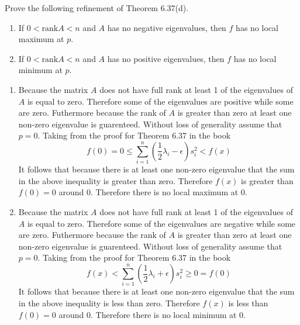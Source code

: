 Prove the following refinement of Theorem 6.37(d).
\begin{enumerate}
\item If $0 < \text{rank}A < n$ and $A$ has no negative eigenvalues,
  then $f$ has no local maximum at $p.$
\item If $0 < \text{rank}A < n$ and $A$ has no positive eigenvalues,
  then $f$ has no local minimum at $p.$
\end{enumerate}
\begin{enumerate}
\item Because the matrix $A$ does not have full rank at least 1 of the
  eigenvalues of $A$ is equal to zero. Therefore some of the
  eigenvalues are positive while some are zero. Futhermore because the
  rank of $A$ is greater than zero at least one non-zero eigenvalue
  is guarenteed. Without loss of
  generality  assume that $p=0.$ Taking from the proof for Theorem
  6.37 in the book 
\begin{equation}
f(0) = 0 \leq \sum\limits_{i=1}^n\left(\frac{1}{2}\lambda_i - \epsilon
\right)s_i^2 < f(x)
\end{equation}
It follows that because there is at least one non-zero eigenvalue that
the sum in the above inequality is greater than zero. Therefore
$f(x)$ is greater than $f(0)=0$ around $0.$ Therefore there is no
local maximum at $0.$ 

\item Because the matrix $A$ does not have full rank at least 1 of the
  eigenvalues of $A$ is equal to zero. Therefore some of the
  eigenvalues are negative while some are zero. Futhermore because the
  rank of $A$ is greater than zero at least one non-zero eigenvalue
  is guarenteed. Without loss of
  generality  assume that $p=0.$ Taking from the proof for Theorem
  6.37 in the book 
\begin{equation}
f(x) < \sum\limits_{i=1}^n\left(\frac{1}{2}\lambda_i + \epsilon
\right)s_i^2 \geq 0 = f(0)
\end{equation}
It follows that because there is at least one non-zero eigenvalue that
the sum in the above inequality is less than zero. Therefore
$f(x)$ is less than $f(0)=0$ around $0.$ Therefore there is no
local minimum at $0.$ 
\end{enumerate}
